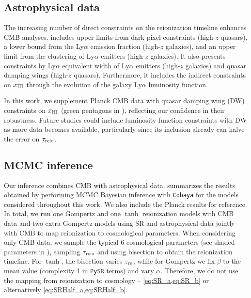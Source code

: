 \subsection*{Astrophysical data}
\label{ssec:xHI}
The increasing number of direct constraints on the reionization timeline
enhances CMB analyses.  includes upper limits from dark 
pixel constraints\cite{Jin2023} (high-$z$ quasars), a lower bound from
the Ly$\alpha$ emission fraction\cite{Mesinger2015} (high-$z$ galaxies), 
and an upper limit from the clustering of Ly$\alpha$ emitters\cite{Sobacchi2015} 
(high-$z$ galaxies). It also presents constraints by Ly$\alpha$ equivalent width of Ly$\alpha$ 
emitters\cite{Mason2018, Mason2018,  Hoag2019} (high-$z$ galaxies) and 
quasar damping wings\cite{Greig2022, Greig2024, Spina2024, Durovcikova2024} 
(high-$z$ quasars). Furthermore, it includes the indirect constraints on $x_{\mathrm{HI}}$ 
through the evolution of the galaxy Ly$\alpha$ luminosity function\cite{Morales2021}.

In this work, we supplement Planck CMB data with quasar damping wing (DW) 
constraints on $x_{\mathrm{HI}}$ (green pentagons in ), reflecting
our confidence in their robustness. Future studies could include luminosity
function constraints with DW as more data becomes available, particularly 
since its inclusion already can halve the error on $\tau_{\mathrm{reio}}$.


\subsection*{MCMC inference}
\label{ssec:fits}
Our inference combines CMB with astrophysical data.  
summarizes the results obtained by performing MCMC
Bayesian inference with \texttt{Cobaya} for the models considered
throughout this work.
We also include the Planck results \cite{Planck2020a} for reference.
In total, we run one Gompertz and one $\tanh$ reionization models with
CMB data and two extra Gompertz models using SR and astrophysical data
jointly with CMB to map reionization to cosmological parameters. 
When considering only CMB data, we sample
the typical 6 cosmological parameters (see shaded parameters in 
), sampling $\tau_{\mathrm{reio}}$ and using bisection to obtain
the reionization timeline. For $\tanh$, the bisection varies $z_{\mathrm{re}}$, 
while for Gompertz we fix $\beta$ to the mean value (complexity 1 
in \texttt{PySR} terms) and vary $\alpha$.  
Therefore, we do not use the mapping from reionization to cosmology --
\cref{eq:SR_a,eq:SR_b} or alternatively \cref{eq:SRHalf_a,eq:SRHalf_b}. 

